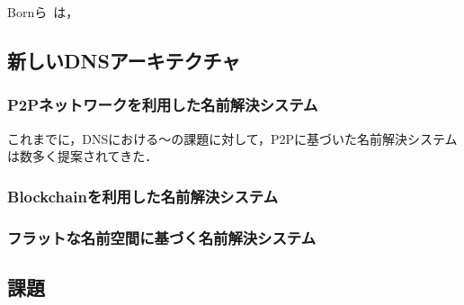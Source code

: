 Bornら~\cite{born}は，

\subsection{新しいDNSアーキテクチャ}
\subsubsection{P2Pネットワークを利用した名前解決システム}
これまでに，DNSにおける〜の課題に対して，P2Pに基づいた名前解決システムは数多く提案されてきた．
\subsubsection{Blockchainを利用した名前解決システム}
\subsubsection{フラットな名前空間に基づく名前解決システム}
\subsection{課題}
\label{sec:issue-past-works}
